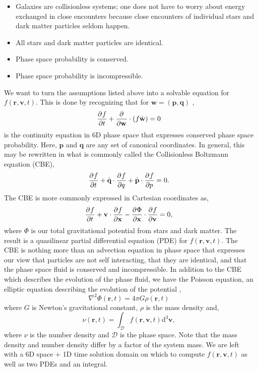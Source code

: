 \begin{itemize}
\item Galaxies are collisionless systems; one does not have to worry about energy exchanged in close encounters because close encounters of individual stars and dark matter particles seldom happen.
\item All stars and dark matter particles are identical.
\item Phase space probability is conserved.
\item Phase space probability is incompressible.
\end{itemize}
We want to turn the assumptions listed above into a solvable equation for $f(\textbf{r},\textbf{v},t)$. This is done by recognizing that  for $\textbf{w} = (\textbf{p}, \textbf{q})$ \citep{BT},
\begin{equation}
\frac{\partial^{} {f}}{\partial {t}^{}} + \frac{\partial^{} {}}{\partial {\textbf{w}}^{}} \cdot \left( f \dot{\textbf{w}}\right) = 0
\end{equation}
is the continuity equation in 6D phase space that expresses conserved phase space probability. Here, $\textbf{p}$ and $\textbf{q}$ are any set of canonical coordinates. In general, this may be rewritten in what is commonly called the Collisionless Boltzmann equation (CBE),
\begin{equation}
\frac{\partial^{} {f}}{\partial {t}^{}} + \dot{\textbf{q}} \cdot \frac{\partial^{} {f}}{\partial {q}^{}} + \dot{\textbf{p}} \cdot \frac{\partial^{} {f}}{\partial {p}^{}} = 0.
\end{equation}
The CBE is more commonly expressed in Cartesian coordinates as,
\begin{equation}
\frac{\partial^{} {f}}{\partial {t}^{}} + \textbf{v} \cdot \frac{\partial^{} {f}}{\partial {\textbf{x}}^{}} - \frac{\partial^{} {\Phi}}{\partial {\textbf{x}}^{}} \cdot \frac{\partial^{} {f}}{\partial {\textbf{v}}^{}} = 0, \label{eq:cbe_cartesian}
\end{equation}
where $\Phi$ is our total gravitational potential from stars and dark matter. The result is a quasilinear partial differential equation (PDE) for $f(\textbf{r},\textbf{v},t)$. The CBE is nothing more than an advection equation in phase space that expresses our view that particles are not self interacting, that they are identical, and that the phase space fluid is conserved and incompressible. In addition to the CBE which describes the evolution of the phase fluid, we have the Poisson equation, an elliptic equation describing the evolution of the potential \citep{BT},
\begin{equation}
\nabla^2 \Phi(\textbf{r},t) = 4 \pi G \rho(\textbf{r},t) \label{eq:poisson}
\end{equation} 
where $G$ is Newton's gravitational constant, $\rho$ is the mass density and,
\begin{equation}
\nu(\textbf{r},t) = \int_{\mathcal{D}} f(\textbf{r}, \textbf{v}, t) \text{d}^3 \textbf{v},
\end{equation}
where $\nu$ is the number density and $\mathcal{D}$ is the phase space. Note that the mass density and number density differ by a factor of the system mass. We are left with a 6D space + 1D time solution domain on which to compute $f(\textbf{r},\textbf{v},t)$ as well as two PDEs and an integral.

